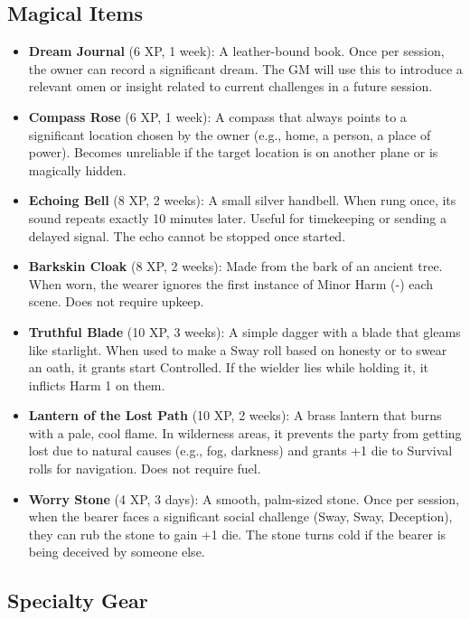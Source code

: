 \documentclass[12pt]{article}
\begin{document}
\subsection*{Magical Items}

\begin{itemize}[leftmargin=*]
  \item \textbf{Dream Journal} (6 XP, 1 week): A leather-bound book. Once per session, the owner can record a significant dream. The GM will use this to introduce a relevant omen or insight related to current challenges in a future session.
  \item \textbf{Compass Rose} (6 XP, 1 week): A compass that always points to a significant location chosen by the owner (e.g., home, a person, a place of power). Becomes unreliable if the target location is on another plane or is magically hidden.
  \item \textbf{Echoing Bell} (8 XP, 2 weeks): A small silver handbell. When rung once, its sound repeats exactly 10 minutes later. Useful for timekeeping or sending a delayed signal. The echo cannot be stopped once started.
  \item \textbf{Barkskin Cloak} (8 XP, 2 weeks): Made from the bark of an ancient tree. When worn, the wearer ignores the first instance of Minor Harm (-) each scene. Does not require upkeep.
  \item \textbf{Truthful Blade} (10 XP, 3 weeks): A simple dagger with a blade that gleams like starlight. When used to make a Sway roll based on honesty or to swear an oath, it grants start Controlled. If the wielder lies while holding it, it inflicts Harm 1 on them.
  \item \textbf{Lantern of the Lost Path} (10 XP, 2 weeks): A brass lantern that burns with a pale, cool flame. In wilderness areas, it prevents the party from getting lost due to natural causes (e.g., fog, darkness) and grants +1 die to Survival rolls for navigation. Does not require fuel.
  \item \textbf{Worry Stone} (4 XP, 3 days): A smooth, palm-sized stone. Once per session, when the bearer faces a significant social challenge (Sway, Sway, Deception), they can rub the stone to gain +1 die. The stone turns cold if the bearer is being deceived by someone else.
\end{itemize}

\subsection*{Specialty Gear}
\end{document}
